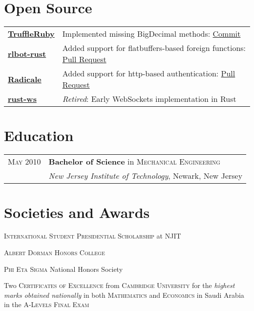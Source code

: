 \documentclass[a4paper,10pt]{article}
\newenvironment{packed-list}{
  \vspace{2pt}
  \begin{itemize}[itemsep=1pt,partopsep=0pt,leftmargin=1.5em]
    \setlength{\parskip}{0pt}
    \setlength{\partopsep}{9pt}
    \setlength{\parsep}{0pt}
    \setlength{\topsep}{0pt}
} {\end{itemize}}
\begin{document}
\section{Open Source}
\begin{tabular}{p{}p{}}
  \hfill \textbf{ \href{https://www.graalvm.org/reference-manual/ruby/}{TruffleRuby} }
    & Implemented missing BigDecimal methods: \href{https://github.com/oracle/truffleruby/commit/dbacbc96ff07bb774a54b3883b35e74d2fb52708}{Commit}
    \vspace{-5pt}
    \\
  \hfill \textbf{ \href{https://github.com/RLBot/rlbot-rust}{rlbot-rust} }
    & Added support for flatbuffers-based foreign functions: \href{https://github.com/RLBot/rlbot-rust/pull/1}{Pull Request}
    \vspace{-5pt}
    \\
  \hfill \textbf{ \href{https://radicale.org/}{Radicale} }
    & Added support for http-based authentication: \href{https://github.com/Kozea/Radicale/pull/15}{Pull Request}
    \vspace{-5pt}
    \\
  \hfill \textbf{ \href{https://github.com/ehsanul/rust-ws}{rust-ws} }
    & {\em Retired}: Early WebSockets implementation in Rust
    \vspace{-5pt}
    \\
\end{tabular}


\section{Education}
\begin{tabular}{rl}
  \textsc{May} 2010 
    & {\bf Bachelor of Science} in \textsc{Mechanical Engineering}\\
    & {\it New Jersey Institute of Technology}, Newark, New Jersey\\
\end{tabular}


\section{Societies and Awards}
\vspace{3pt}
\begin{packed-list}
  \item\textsc{International Student Presidential Scholarship} at NJIT
  \item\textsc{Albert Dorman Honors College}
  \item\textsc{Phi Eta Sigma} National Honors Society
  \item Two \textsc{Certificates of Excellence} from \textsc{Cambridge
    University} for the \emph{highest marks obtained nationally} in both
    \textsc{Mathematics} and \textsc{Economics} in Saudi Arabia in the
    \textsc{A-Levels Final Exam}
\end{packed-list}
\end{document}

